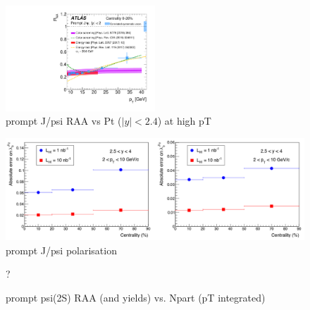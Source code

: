 \documentclass[../report.tex]{subfiles}
\begin{document}
\begin{figure}
\begin{center}
 \includegraphics[width=0.5\textwidth]{fig/atlas/atlas_promptjpsi_models}
\end{center}

 \caption{prompt J/psi RAA vs Pt ($|y|<2.4$) at high pT~\cite{Aaboud:2018quy}}
\end{figure}

\begin{figure}
\begin{center}
\includegraphics[width=\textwidth]{fig/alice/jpsi_polarisation.png}
\end{center}

 \caption{prompt J/psi polarisation~\cite{Abelev:1475243}}
\end{figure}

\begin{figure}
\begin{center}
 ?
\end{center}

 \caption{prompt psi(2S) RAA (and yields) vs. Npart (pT integrated) }
\end{figure}
\end{document}
